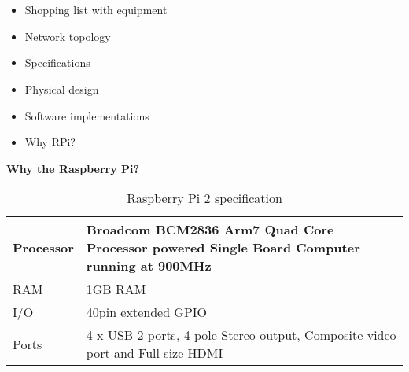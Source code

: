 \chapter{}


\begin{itemize}
	\item Shopping list with equipment
	\item Network topology
	\item Specifications
	\item Physical design
	\item Software implementations
	\item Why RPi?
\end{itemize}



\textbf{Why the Raspberry Pi?}\\
\begin{table}[H]
\centering
\begin{tabular}{|p{2cm}|p{8cm}|}
\hline
Processor & Broadcom BCM2836 Arm7 Quad Core Processor powered Single Board Computer running at 900MHz \\ \hline
RAM       & 1GB RAM                                                                                   \\ \hline
I/O       & 40pin extended GPIO                                                                       \\ \hline
Ports     & 4 x USB 2 ports, 4 pole Stereo output, Composite video port and Full size HDMI            \\ \hline
\end{tabular}
\caption{Raspberry Pi 2 specification}
\label{raspberry_specs}
\end{table}